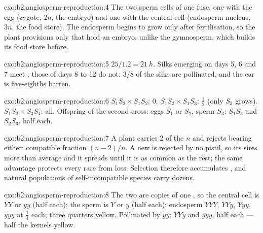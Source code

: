 \begin{solution}{exo:b2:angiosperm-reproduction:4}
The two sperm cells of one  fuse, one with the egg
(zygote, $2n$, the embryo) and one with the central cell (endosperm
nucleus, $3n$, the food store). The endosperm begins to grow only
after fertilisation, so the plant provisions only  that hold
an embryo, unlike the gymnosperm, which builds its food store before.
\end{solution}

\begin{solution}{exo:b2:angiosperm-reproduction:5}
$25/1.2 = \qty{21}{h}$. Silks emerging on days 5, 6 and 7 meet ;
those of days 8 to 12 do not: $3/8$ of the silks are pollinated, and
the ear is five-eighths barren.
\end{solution}

\begin{solution}{exo:b2:angiosperm-reproduction:6}
$S_1S_2\times S_1S_2$: 0. $S_1S_2\times S_1S_3$: $\tfrac12$ (only $S_3$
 grows). $S_1S_2\times S_3S_4$: all. Offspring of the second
cross: eggs $S_1$ or $S_2$, sperm $S_3$: $S_1S_3$ and $S_2S_3$, half
each.
\end{solution}

\begin{solution}{exo:b2:angiosperm-reproduction:7}
A plant carries 2 of the $n$  and rejects  bearing
either: compatible fraction $(n - 2)/n$. A new  is rejected by
no pistil, so its  sires more  than average and it spreads
until it is as common as the rest; the same advantage protects every
rare  from loss. Selection therefore accumulates , and
natural populations of self-incompatible species carry dozens.
\end{solution}

\begin{solution}{exo:b2:angiosperm-reproduction:8}
The two  are copies of one , so the central
cell is $YY$ or $yy$ (half each); the sperm is $Y$ or $y$ (half
each): endosperm $YYY$, $YYy$, $Yyy$, $yyy$ at $\tfrac14$ each; three
quarters yellow. Pollinated by $yy$: $YYy$ and $yyy$, half each ---
half the kernels yellow.
\end{solution}

